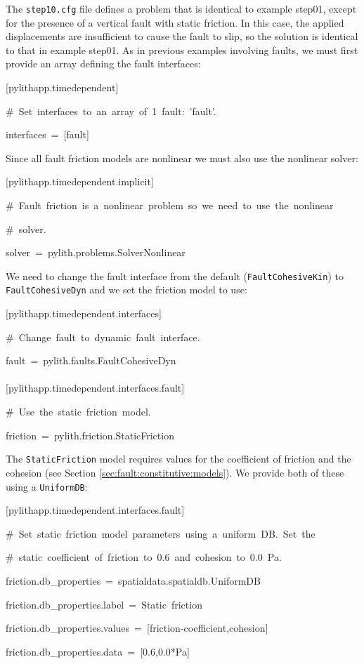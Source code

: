 The \texttt{step10.cfg} file defines a problem that is identical to
example step01, except for the presence of a vertical fault with static
friction. In this case, the applied displacements are insufficient
to cause the fault to slip, so the solution is identical to that in
example step01. As in previous examples involving faults, we must
first provide an array defining the fault interfaces:
\begin{lyxcode}
{[}pylithapp.timedependent{]}

\#~Set~interfaces~to~an~array~of~1~fault:~'fault'.

interfaces~=~{[}fault{]}
\end{lyxcode}
Since all fault friction models are nonlinear we must also use the
nonlinear solver:
\begin{lyxcode}
{[}pylithapp.timedependent.implicit{]}

\#~Fault~friction~is~a~nonlinear~problem~so~we~need~to~use~the~nonlinear

\#~solver.

solver~=~pylith.problems.SolverNonlinear
\end{lyxcode}
We need to change the fault interface from the default (\texttt{FaultCohesiveKin})
to \texttt{FaultCohesiveDyn} and we set the friction model to use:
\begin{lyxcode}
{[}pylithapp.timedependent.interfaces{]}

\#~Change~fault~to~dynamic~fault~interface.

fault~=~pylith.faults.FaultCohesiveDyn~\\
~\\


{[}pylithapp.timedependent.interfaces.fault{]}

\#~Use~the~static~friction~model.

friction~=~pylith.friction.StaticFriction
\end{lyxcode}
The \texttt{StaticFriction} model requires values for the coefficient
of friction and the cohesion (see Section \vref{sec:fault:constitutive:models}).
We provide both of these using a \texttt{UniformDB}:
\begin{lyxcode}
{[}pylithapp.timedependent.interfaces.fault{]}

\#~Set~static~friction~model~parameters~using~a~uniform~DB.~Set~the

\#~static~coefficient~of~friction~to~0.6~and~cohesion~to~0.0~Pa.

friction.db\_properties~=~spatialdata.spatialdb.UniformDB

friction.db\_properties.label~=~Static~friction

friction.db\_properties.values~=~{[}friction-coefficient,cohesion{]}

friction.db\_properties.data~=~{[}0.6,0.0{*}Pa{]}
\end{lyxcode}
